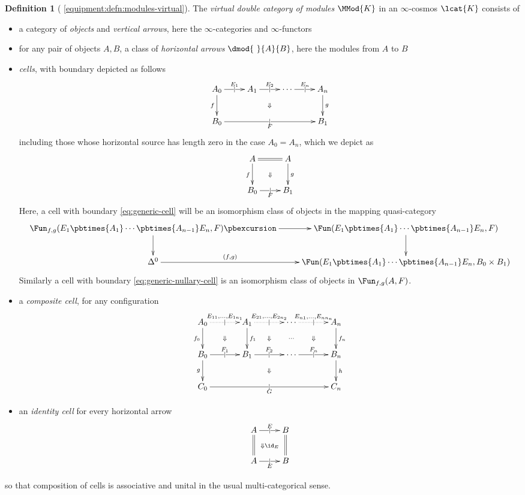 \documentclass[12pt,reqno]{amsart}
\theoremstyle{plain}
\theoremstyle{definition}
\newtheorem{defn}[thm]{Definition}
\theoremstyle{remark}
\numberwithin{equation}{subsection}
\newcommand{\extRef}[3]{%
  {\protect\IfBeginWith{#3}{itm:}{}{#2.}}\ref*{#1:#3}}
\newcommand{\refV}{\extRef{equipment}{V}}
\begin{document}
\begin{defn}[{\refV{defn:modules-virtual}}] The \emph{virtual double category of modules} $\MMod{K}$ in an $\infty$-cosmos $\lcat{K}$ consists of
\begin{itemize}
\item a category of \emph{objects} and \emph{vertical arrows}, here the $\infty$-categories and $\infty$-functors
\item for any pair of objects $A, B$, a class of \emph{horizontal arrows} $\dmod{~}{A}{B}$, here the modules from $A$ to $B$
\item \emph{cells}, with boundary depicted as follows
\begin{equation}\label{eq:generic-cell} \xymatrix{ A_0 \ar[d]_{f} \ar[r]|{\mid}^{E_1} & A_1 \ar[r]|{\mid}^{E_2}  \ar@{}[dr]|{\Downarrow} & \cdots \ar[r]|{\mid}^{E_n} & A_n \ar[d]^g \\ B_0 \ar[rrr]|{\mid}_{F} & & & B_1}\end{equation} including those whose horizontal source has length zero in the case $A_0 = A_n$, which we depict as
\begin{equation}\label{eq:generic-nullary-cell} \xymatrix{A \ar[d]_f \ar@{=}[r] \ar@{}[dr]|{\Downarrow} & A \ar[d]^g \\ B_0 \ar[r]|{\mid}_F & B_1}\end{equation}
 Here, a cell with boundary \eqref{eq:generic-cell} will be an isomorphism class of objects in the mapping quasi-category
\[ \xymatrix{ \Fun_{f,g}(E_1 \pbtimes{A_1} \cdots \pbtimes{A_{n-1}} E_n, F) \ar[r] \ar[d] \pbexcursion & \Fun(E_1 \pbtimes{A_1} \cdots \pbtimes{A_{n-1}} E_n, F) \ar[d] \\ \Delta^0 \ar[r]^-{(f,g)} & \Fun(E_1 \pbtimes{A_1} \cdots \pbtimes{A_{n-1}} E_n, B_0 \times B_1)}\] Similarly a cell with boundary \eqref{eq:generic-nullary-cell} is an isomorphism class of objects in $\Fun_{f,g}(A,F)$.
\item a \emph{composite cell}, for any configuration
\[ \xymatrix@C=35pt{ A_0 \ar[d]_{f_0} \ar@{..>}[r]|{\mid}^{E_{11},\dots, E_{1n_1}} \ar@{}[dr]|{\Downarrow}  & A_1 \ar@{..>}[r]|{\mid}^{E_{21},\ldots, E_{2n_2}} \ar[d]^{f_1}  \ar@{}[dr]|{\Downarrow} & \cdots \ar@{..>}[r]|{\mid}^{E_{n1},\ldots, E_{nn_n}}  \ar@{}[d]|\cdots \ar@{}[dr]|{\Downarrow} & A_n \ar[d]^{f_n} \\ B_0 \ar[d]_{g} \ar[r]|{\mid}^{F_1} & B_1 \ar[r]|{\mid}^{F_2}  \ar@{}[dr]|{\Downarrow} & \cdots \ar[r]|{\mid}^{F_n} & B_n \ar[d]^h \\ C_0 \ar[rrr]|{\mid}_{G} & & & C_n}\] 
\item an \emph{identity cell} for every horizontal arrow 
\[ \xymatrix{ A \ar@{=}[d] \ar[r]|{\mid}^E & B \ar@{=}[d] \ar@{}[dl]|{\Downarrow \id_E} \\ A \ar[r]|{\mid}_E & B}\] 
\end{itemize}
so that composition of cells is associative and unital in the usual multi-categorical sense.
\end{defn}
\end{document}
